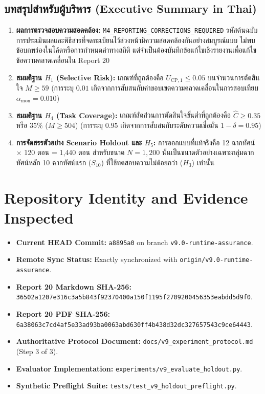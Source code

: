 \documentclass[10pt,a4paper]{article}
\begin{document}
\subsection{\thaifont บทสรุปสำหรับผู้บริหาร (Executive Summary in Thai)}
\begin{enumerate}
    \item \textbf{\thaifont ผลการตรวจสอบความสอดคล้อง:} \texttt{M4\_REPORTING\_CORRECTIONS\_REQUIRED} \thaifont รหัสต้นฉบับการประเมินผลและพิธีสารที่จดทะเบียนไว้ล่วงหน้ามีความสอดคล้องกันอย่างสมบูรณ์แบบ ไม่พบข้อบกพร่องในโค้ดหรือการกำหนดค่าทางสถิติ แต่จำเป็นต้องบันทึกข้อแก้ไขเชิงรายงานเพื่อแก้ไขข้อความคลาดเคลื่อนใน Report 20
    \item \textbf{\thaifont สมมติฐาน $H_1$ (Selective Risk):} \thaifont เกณฑ์ที่ถูกต้องคือ $U_{\mathrm{CP},1} \le 0.05$ บนจำนวนการตัดสินใจ $M \ge 59$ (การระบุ $0.01$ เกิดจากการสับสนกับค่าขอบเขตความคลาดเคลื่อนในการสอบเทียบ $\alpha_{\text{mon}} = 0.010$)
    \item \textbf{\thaifont สมมติฐาน $H_4$ (Task Coverage):} \thaifont เกณฑ์สัดส่วนการตัดสินใจขั้นต่ำที่ถูกต้องคือ $\hat{C} \ge 0.35$ หรือ $35\%$ ($M \ge 504$) (การระบุ $0.95$ เกิดจากการสับสนกับระดับความเชื่อมั่น $1-\delta = 0.95$)
    \item \textbf{\thaifont การจัดสรรตัวอย่าง Scenario Holdout และ $H_5$:} \thaifont การออกแบบที่แท้จริงคือ 12 ฉากทัศน์ $\times$ 120 ตอน = 1,440 ตอน สำหรับขนาด $N = 1,200$ นั้นเป็นขนาดตัวอย่างเฉพาะกลุ่มฉากทัศน์หลัก 10 ฉากทัศน์แรก ($S_{10}$) ที่ใช้ทดสอบความไม่ด้อยกว่า ($H_3$) เท่านั้น
\end{enumerate}

\section{Repository Identity and Evidence Inspected}
\begin{itemize}
    \item \textbf{Current HEAD Commit:} \texttt{a8895a0} on branch \texttt{v9.0-runtime-assurance}.
    \item \textbf{Remote Sync Status:} Exactly synchronized with \texttt{origin/v9.0-runtime-assurance}.
    \item \textbf{Report 20 Markdown SHA-256:} \texttt{36502a1207e316c3a5b843f92370400a150f1195f2709200456353eabdd5d9f0}.
    \item \textbf{Report 20 PDF SHA-256:} \texttt{6a38063c7cd4af5e33ad93ba0063abd630ff4b438d32dc327657543c9ce64443}.
    \item \textbf{Authoritative Protocol Document:} \texttt{docs/v9\_experiment\_protocol.md} (Step 3 of 3).
    \item \textbf{Evaluator Implementation:} \texttt{experiments/v9\_evaluate\_holdout.py}.
    \item \textbf{Synthetic Preflight Suite:} \texttt{tests/test\_v9\_holdout\_preflight.py}.
\end{itemize}
\end{document}
